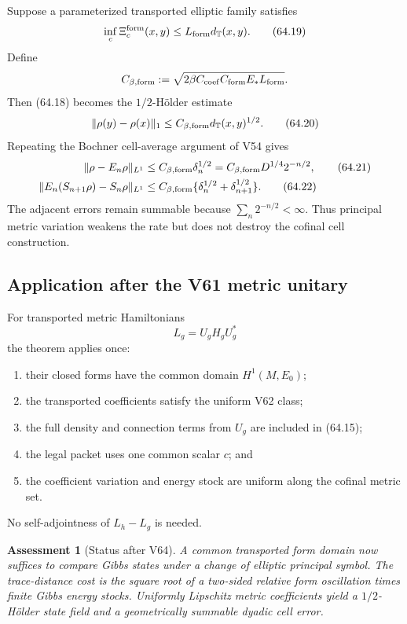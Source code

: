 \documentclass[11pt]{article}
\newtheorem{assessment}[theorem]{Assessment}
\theoremstyle{remark}
\begin{document}
Suppose a parameterized transported elliptic family satisfies
\begin{equation}
 \inf_c\Xi_c^{\rm form}(x,y)
 \leq L_{\rm form}d_{\mathbb T}(x,y).             \tag{64.19}
\end{equation}
Define
\[
 C_{\beta,\rm form}
 :=
 \sqrt{2\beta C_{\rm coef}C_{\rm form}E_*L_{\rm form}}.
\]
Then (64.18) becomes the \(1/2\)-Hölder estimate
\begin{equation}
 \|\rho(y)-\rho(x)\|_1
 \leq C_{\beta,\rm form}d_{\mathbb T}(x,y)^{1/2}. \tag{64.20}
\end{equation}
Repeating the Bochner cell-average argument of V54 gives
\begin{align}
 \|\rho-E_n\rho\|_{L^1}
 &\leq
 C_{\beta,\rm form}\delta_n^{1/2}
 =
 C_{\beta,\rm form}D^{1/4}2^{-n/2},               \tag{64.21}\\
 \|E_n(S_{n+1}\rho)-S_n\rho\|_{L^1}
 &\leq
 C_{\beta,\rm form}
 \{\delta_n^{1/2}+\delta_{n+1}^{1/2}\}.           \tag{64.22}
\end{align}
The adjacent errors remain summable because
\(\sum_n2^{-n/2}<\infty\).  Thus principal metric variation weakens
the rate but does not destroy the cofinal cell construction.

\subsection{Application after the V61 metric unitary}

For transported metric Hamiltonians
\[
 L_g=U_gH_gU_g^*
\]
the theorem applies once:
\begin{enumerate}
\item their closed forms have the common domain \(H^1(M,E_0)\);
\item the transported coefficients satisfy the uniform V62 class;
\item the full density and connection terms from \(U_g\) are
included in (64.15);
\item the legal packet uses one common scalar \(c\); and
\item the coefficient variation and energy stock are uniform along
the cofinal metric set.
\end{enumerate}
No self-adjointness of \(L_h-L_g\) is needed.

\begin{assessment}[Status after V64]
\label{ass:v12v64-status}
A common transported form domain now suffices to compare Gibbs
states under a change of elliptic principal symbol.  The
trace-distance cost is the square root of a two-sided relative form
oscillation times finite Gibbs energy stocks.  Uniformly Lipschitz
metric coefficients yield a \(1/2\)-Hölder state field and a
geometrically summable dyadic cell error.
\end{assessment}
\end{document}
